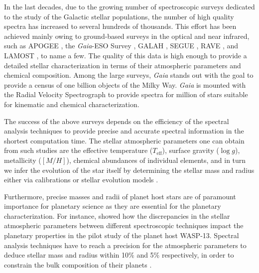\documentclass[fleqn,usenatbib]{mnras}
\begin{document}
In the last decades, due to the growing number of spectroscopic surveys dedicated to the study of the Galactic stellar populations, the number of high quality spectra has increased 
to several hundreds of thousands. This effort has been achieved mainly owing to ground-based surveys in the optical and near infrared, such as APOGEE \citep{Majewski2015}, 
the \textit{Gaia}-ESO Survey \citep[GES;][]{gilmore2012}, GALAH \citep{desilva2015}, SEGUE \citep{Yanny2009}, RAVE \citep{Steinmetz2006}, and LAMOST \citep{Zhao2012}, to name a few. 
The quality of this data is high enough to provide a detailed stellar characterization in terms of their atmospheric parameters and chemical composition. 
Among the large surveys, \textit{Gaia} \citep{Perryman2001} stands out with the goal to provide a census of one billion 
objects of the Milky Way. \textit{Gaia} is mounted with the Radial Velocity Spectrograph \citep{Wilkinson2005} to provide spectra for 
million of stars suitable for kinematic and chemical characterization. 

The success of the above surveys depends on the efficiency of the spectral analysis techniques to provide precise and accurate spectral information in 
the shortest computation time. The stellar atmospheric parameters one can obtain from such studies are the effective temperature ($T_{\mathrm{eff}}$), surface gravity 
($\log g$), metallicity ($[M/H]$), chemical abundances of individual elements, and in turn we infer the evolution of the star itself by determining the stellar mass and 
radius either via calibrations \citep{torres10_mass, santos13} or stellar evolution models \citep[e.g.][]{girardi2002}. 

Furthermore, precise masses and radii of planet host stars are of paramount importance for planetary science as they are essential for the planetary characterization. 
For instance, \cite{gomez2013} showed how the discrepancies in the stellar atmospheric parameters between different spectroscopic techniques impact the planetary properties in the pilot study of the 
planet host WASP-13. Spectral analysis techniques have to reach a precision for the atmospheric parameters to deduce stellar mass and radius within 10\% and 5\% respectively, 
in order to constrain the bulk composition of their planets \citep[e.g.][]{Wagner2011}.
\end{document}
